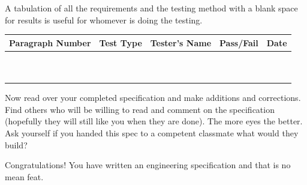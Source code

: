 \begin{slshape}
	\color{blue}
  A tabulation of all the requirements and the testing method with a blank space for results is useful for whomever is doing the testing.
\end{slshape}

\begin{table}[h]
\centering
\begin{tabular}{|c|c|C{6cm}|c|c|}
\hline
\textbf{Paragraph Number} & \textbf{Test Type}& 
\textbf{Tester's Name} & \textbf{Pass/Fail} & \textbf{Date} \\
\hline
 & & & & \\
\hline
 & & & & \\
\hline
 & & & & \\
\hline
 & & & & \\
\hline
 & & & & \\
\hline
 & & & & \\
\hline
 & & & & \\
\hline
 & & & & \\
\hline
 & & & & \\
\hline
 & & & & \\
\hline
\end{tabular}
\end{table}

\begin{slshape}
\color{blue}
\StopSign Now read over your completed specification and make additions and corrections.  Find others who will be willing to read and comment on the specification (hopefully they will still like you when they are done).  The more eyes the better.  Ask yourself if you handed this spec to a competent classmate what would they build?
\bigskip

Congratulations!  You have written an engineering specification and that is no mean feat.
\end{slshape}